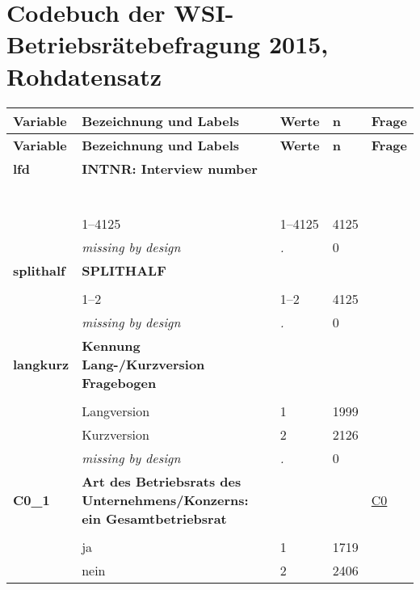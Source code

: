 \section{Codebuch der WSI-Betriebsrätebefragung 2015, Rohdatensatz}\label{kap_rohdaten}
\begin{longtable}{| L{2.65cm} | L{8cm} | C{1.5cm} | R{1.25cm} | C{2.25cm}  |}
\toprule
\textbf{Variable} & \textbf{Bezeichnung und Labels}& \textbf{Werte} &  \textbf{n} & \textbf{Frage} \\
\midrule
\endfirsthead
\toprule
\textbf{Variable} & \textbf{Bezeichnung und Labels}& \textbf{Werte} & \textbf{n} & \textbf{Frage}  \\
\midrule
\endhead
\midrule
\endfoot
\bottomrule
\endlastfoot
 \textbf{lfd}\label{var:lfd} & \textbf{INTNR: Interview number} &  &  &  \\ 
   & \protect\subsection[Variablen lfd bis ORDER37\_G1]{} &  &  &  \\ 
   & 1--4125 & 1--4125 & 4125 &  \\ 
   & \textit{missing by design} & \textit{.} & 0 &  \\ 
   \midrule
\textbf{splithalf}\label{var:splithalf} & \textbf{SPLITHALF} &  &  &  \\ 
   &  &  &  &  \\ 
   & 1--2 & 1--2 & 4125 &  \\ 
   & \textit{missing by design} & \textit{.} & 0 &  \\ 
   \midrule
\textbf{langkurz}\label{var:langkurz} & \textbf{Kennung Lang-/Kurzversion Fragebogen} &  &  &  \\ 
   &  &  &  &  \\ 
   & Langversion & 1 & 1999 &  \\ 
   & Kurzversion & 2 & 2126 &  \\ 
   & \textit{missing by design} & \textit{.} & 0 &  \\ 
   \midrule
\textbf{C0\_1}\label{var:C0:1} & \textbf{Art des Betriebsrats des Unternehmens/Konzerns: ein Gesamtbetriebsrat} &  &  & \hyperref[C0]{C0} \\ 
   &  &  &  &  \\ 
   & ja & 1 & 1719 &  \\ 
   & nein & 2 & 2406 &  \\ 

\end{longtable}
